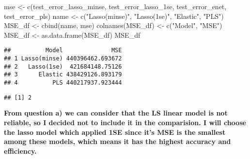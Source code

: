 \documentclass[
]{article}
\newenvironment{Shaded}{\begin{snugshade}}{\end{snugshade}}
\newcommand{\FunctionTok}[1]{\textcolor[rgb]{0.00,0.00,0.00}{#1}}
\newcommand{\NormalTok}[1]{#1}
\newcommand{\OtherTok}[1]{\textcolor[rgb]{0.56,0.35,0.01}{#1}}
\newcommand{\SpecialCharTok}[1]{\textcolor[rgb]{0.00,0.00,0.00}{#1}}
\newcommand{\StringTok}[1]{\textcolor[rgb]{0.31,0.60,0.02}{#1}}
\begin{document}
\begin{Shaded}
\begin{Highlighting}[]
\NormalTok{mse }\OtherTok{\textless{}{-}} \FunctionTok{c}\NormalTok{(test\_error\_lasso\_minse, test\_error\_lasso\_1se, test\_error\_enet, test\_error\_pls)}
\NormalTok{name }\OtherTok{\textless{}{-}} \FunctionTok{c}\NormalTok{(}\StringTok{"Lasso(minse)"}\NormalTok{, }\StringTok{"Lasso(1se)"}\NormalTok{, }\StringTok{"Elastic"}\NormalTok{, }\StringTok{"PLS"}\NormalTok{)}
\NormalTok{MSE\_df }\OtherTok{\textless{}{-}} \FunctionTok{cbind}\NormalTok{(name, mse)}
\FunctionTok{colnames}\NormalTok{(MSE\_df) }\OtherTok{\textless{}{-}} \FunctionTok{c}\NormalTok{(}\StringTok{"Model"}\NormalTok{, }\StringTok{"MSE"}\NormalTok{)}
\NormalTok{MSE\_df }\OtherTok{\textless{}{-}} \FunctionTok{as.data.frame}\NormalTok{(MSE\_df)}
\NormalTok{MSE\_df}
\end{Highlighting}
\end{Shaded}

\begin{verbatim}
##          Model              MSE
## 1 Lasso(minse) 440396462.693672
## 2   Lasso(1se)  421684148.75126
## 3      Elastic 438429126.893179
## 4          PLS 440217937.923444
\end{verbatim}

\begin{Shaded}
\end{Shaded}

\begin{verbatim}
## [1] 2
\end{verbatim}

\textbf{From question a) we can consider that the LS linear model is not
reliable, so I decided not to include it in the comparision. I will
choose the lasso model which applied 1SE since it's MSE is the smallest
among these models, which means it has the highest accuracy and
efficiency.}
\end{document}
